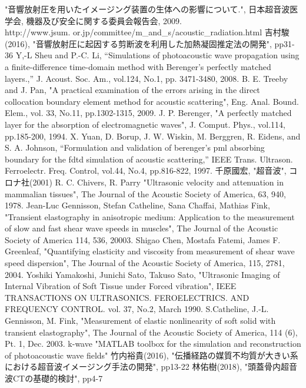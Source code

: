 \begin{thebibliography}{9}
     "音響放射圧を用いたイメージング装置の生体への影響について.", 日本超音波医学会, 機器及び安全に関する委員会報告会, 2009. \\http://www.jsum. or.jp/committee/m\_and\_s/acoustic\_radiation.html
      吉村駿(2016),
     "音響放射圧に起因する剪断波を利用した加熱凝固推定法の開発", pp31-36
      Y,-L Sheu and P.-C. Li,
     “Simulations of photoacoustic wave propagation using a finite-difference time-domain method with Berenger’s perfectly matched layers.,” J. Acoust. Soc. Am., vol.124, No.1, pp. 3471-3480, 2008.
      B. E. Treeby and J. Pan,
      "A practical examination of the errors arising in the direct collocation boundary element method for acoustic scattering", Eng. Anal. Bound. Elem., vol. 33, No.11,  pp.1302-1315, 2009.
      J. P. Berenger,
     "A perfectly matched layer for the absorption of electromagnetic waves", J. Comput. Phys., vol.114, pp.185-200, 1994. 
      X. Yuan, D. Borup, J. W. Wiskin, M. Berggren, R. Eidens, and S. A. Johnson,
“Formulation and validation of berenger’s pml absorbing boundary for the fdtd simulation of acoustic scattering,” IEEE Trans. Ultrason. Ferroelectr. Freq. Control, vol.44, No.4, pp.816-822, 1997.
      千原國宏,     
     "超音波", コロナ社(2001)
      R. C. Chivers, R. Parry
     "Ultrasonic velocity and attenuation in mammalian tissues", The Journal of the Acoustic Society of America, 63, 940, 1978.
       Jean-Luc Gennisson, Stefan Catheline, Sana Chaffai, Mathias Fink,
      "Transient elastography in anisotropic medium: Application to the measurement of slow and fast shear wave speeds in muscles", The Journal of the Acoustic Society of America 114, 536, 20003.
       Shigao Chen, Mostafa Fatemi, James F. Greenleaf,
      "Quantifying elasticity and viscosity from measurement of shear wave speed dispersion", The Journal of the Acoustic Society of America, 115, 2781, 2004.
       Yoshiki Yamakoshi, Junichi Sato, Takuso Sato,
      "Ultrasonic Imaging of Internal Vibration of Soft Tissue under Forced vibration", IEEE TRANSACTIONS ON ULTRASONICS. FEROELECTRICS. AND FREQUENCY CONTROL. vol. 37, No.2, March 1990.
       S.Catheline, J.-L. Gennisson, M. Fink,
      "Measurement of elastic nonlinearity of soft solid with transient elastography", The Journal of the Acoustic Society of America, 114 (6), Pt. 1, Dec. 2003.
      k-wave
     "MATLAB toolbox for the simulation and reconstruction of photoacoustic wave fields"
           竹内裕貴(2016),
     "伝播経路の媒質不均質が大きい系における超音波イメージング手法の開発", pp13-22
      林佑樹(2018),
     "頭蓋骨内超音波CTの基礎的検討", pp4-7
\end{thebibliography}